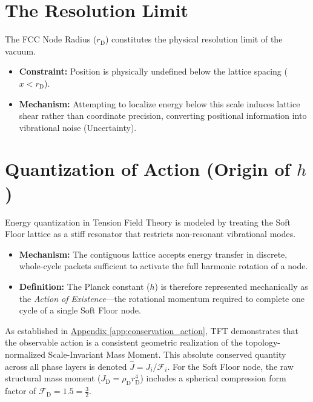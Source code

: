 \section{The Resolution Limit}
The FCC Node Radius ($r_{\mathrm{D}}$) constitutes the physical resolution limit of the vacuum.
\begin{itemize}
    \item \textbf{Constraint:} Position is physically undefined below the lattice spacing ($x < r_{\mathrm{D}}$).
    \item \textbf{Mechanism:} Attempting to localize energy below this scale induces lattice shear rather than coordinate precision, converting positional information into vibrational noise (Uncertainty).
\end{itemize}

\section{Quantization of Action (Origin of $h$)}

Energy quantization in Tension Field Theory is modeled by treating the Soft Floor lattice as a stiff resonator that restricts non-resonant vibrational modes.

\begin{itemize}

\item \textbf{Mechanism:} The contiguous lattice accepts energy transfer in discrete, whole-cycle packets sufficient to activate the full harmonic rotation of a node.

\item \textbf{Definition:} The Planck constant ($h$) is therefore represented mechanically as the \textit{Action of Existence}---the rotational momentum required to complete one cycle of a single Soft Floor node.

\end{itemize}

As established in \hyperref[app:conservation_action]{Appendix \ref*{app:conservation_action}}, TFT demonstrates that the observable action is a consistent geometric realization of the topology-normalized Scale-Invariant Mass Moment. This absolute conserved quantity across all phase layers is denoted $\hat{J} = J_i / \mathcal{F}_i$. For the Soft Floor node, the raw structural mass moment ($J_{\mathrm{D}} = \rho_{\mathrm{D}} r_{\mathrm{D}}^4$) includes a spherical compression form factor of $\mathcal{F}_{\mathrm{D}} = 1.5 = \frac{3}{2}$.

